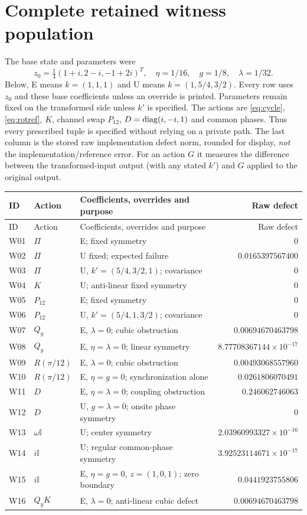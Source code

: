 \documentclass[11pt,a4paper]{article}
\numberwithin{equation}{section}
\newcommand{\I}{\mathbb I}\newcommand{\Argz}{\operatorname{Arg}_0}
\begin{document}
\section{Complete retained witness population}\label{app:witness}
The base state and parameters were
\begin{equation}
 z_0=\tfrac14(1+i,2-i,-1+2i)^T,\quad\eta=1/16,\quad g=1/8,\quad\lambda=1/32.
\end{equation}
Below, E means $k=(1,1,1)$ and U means $k=(1,5/4,3/2)$. Every row uses $z_0$ and these base coefficients unless an override is printed. Parameters remain fixed on the transformed side unless $k'$ is specified. The actions are \eqref{eq:cycle}, \eqref{eq:rotref}, $K$, channel swap $P_{12}$, $D=\operatorname{diag}(i,-i,1)$ and common phases. Thus every prescribed tuple is specified without relying on a private path. The last column is the stored raw implementation defect norm, rounded for display, \emph{not} the implementation/reference error. For an action $G$ it measures the difference between the transformed-input output (with any stated $k'$) and $G$ applied to the original output.

{\small
\begin{longtable}{@{}p{.07\linewidth}p{.13\linewidth}p{.51\linewidth}r@{}}
\toprule ID & Action & Coefficients, overrides and purpose & Raw defect\\\midrule\endfirsthead
\toprule ID & Action & Coefficients, overrides and purpose & Raw defect\\\midrule\endhead
W01 & $\Pi$ & E; fixed symmetry & $0$\\
W02 & $\Pi$ & U fixed; expected failure & $0.0165397567400$\\
W03 & $\Pi$ & U, $k'=(5/4,3/2,1)$; covariance & $0$\\
W04 & $K$ & U; anti-linear fixed symmetry & $0$\\
W05 & $P_{12}$ & E; fixed symmetry & $0$\\
W06 & $P_{12}$ & U, $k'=(5/4,1,3/2)$; covariance & $0$\\
W07 & $Q_y$ & E, $\lambda=0$; cubic obstruction & $0.00694670463798$\\
W08 & $Q_y$ & E, $\eta=\lambda=0$; linear symmetry & $8.77708367144\!\times\!10^{-17}$\\
W09 & $R(\pi/12)$ & E, $\lambda=0$; cubic obstruction & $0.00493068557960$\\
W10 & $R(\pi/12)$ & E, $\eta=g=0$; synchronization alone & $0.0261806070491$\\
W11 & $D$ & E, $\eta=\lambda=0$; coupling obstruction & $0.246062746063$\\
W12 & $D$ & U, $g=\lambda=0$; onsite phase symmetry & $0$\\
W13 & $\omega\I$ & U; center symmetry & $2.03960993327\!\times\!10^{-16}$\\
W14 & $i\I$ & U; regular common-phase symmetry & $3.92523114671\!\times\!10^{-17}$\\
W15 & $i\I$ & E, $\eta=g=0$, $z=(1,0,1)$; zero boundary & $0.0441923755806$\\
W16 & $Q_yK$ & E, $\lambda=0$; anti-linear cubic defect & $0.00694670463798$\\\bottomrule
\end{longtable}}
\end{document}
